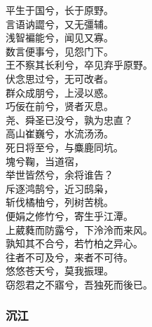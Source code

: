 \documentclass[]{article}
\begin{document}
平生于国兮，长于原野。\\
言语讷譅兮，又无彊辅。\\
浅智褊能兮，闻见又寡。\\
数言便事兮，见怨门下。\\
王不察其长利兮，卒见弃乎原野。\\
伏念思过兮，无可改者。\\
群众成朋兮，上浸以惑。\\
巧佞在前兮，贤者灭息。\\
尧、舜圣已没兮，孰为忠直？\\
高山崔巍兮，水流汤汤。\\
死日将至兮，与麋鹿同坑。\\
塊兮鞠，当道宿，\\
举世皆然兮，余将谁告？\\
斥逐鸿鹄兮，近习鸱枭，\\
斩伐橘柚兮，列树苦桃。\\
便娟之修竹兮，寄生乎江潭。\\
上葳蕤而防露兮，下泠泠而来风。\\
孰知其不合兮，若竹柏之异心。\\
往者不可及兮，来者不可待。\\
悠悠苍天兮，莫我振理。\\
窃怨君之不寤兮，吾独死而後已。

\hypertarget{header-n230}{%
\subsubsection{沉江}\label{header-n230}}
\end{document}
